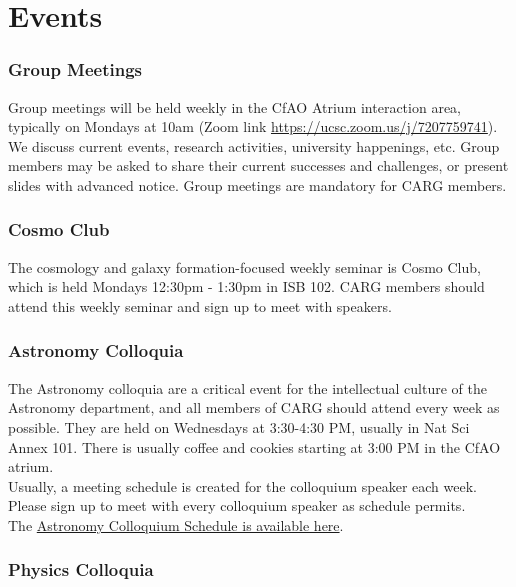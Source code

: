 \section{Events}
\label{sec:events}

\subsubsection{Group Meetings}
\label{sec:group_meetings}
Group meetings will be held
weekly
in the CfAO Atrium interaction
area, typically on Mondays at 10am
(Zoom link \href{https://ucsc.zoom.us/j/7207759741}{https://ucsc.zoom.us/j/7207759741}).
We discuss current events,
research activities, university
happenings, etc. Group members
may be asked to share their
current successes and challenges,
or present slides with advanced
notice.
Group meetings are mandatory
for CARG members.

\subsubsection{Cosmo Club}
\label{sec:cosmo_club}

The cosmology and galaxy
formation-focused weekly
seminar is Cosmo Club, 
which is held
Mondays 12:30pm - 1:30pm in
ISB 102. CARG members should
attend this weekly seminar
and sign up 
to meet with speakers.

\subsubsection{Astronomy Colloquia}
\label{sec:astro_colloquia}

The Astronomy colloquia are a
critical event for the
intellectual culture of the
Astronomy department, and all
members of CARG should attend
every week as possible.
They are held on Wednesdays
at 3:30-4:30 PM, usually in
Nat Sci Annex 101.
There is usually
coffee and cookies starting
at 3:00 PM in the CfAO atrium.\\

\noindent
Usually, a meeting schedule is 
created for the colloquium speaker each
week. Please sign up to meet
with every colloquium speaker as
schedule permits.\\

\noindent
The
\href{https://www.astro.ucsc.edu/news-events/Seminars/index.html}{Astronomy Colloquium Schedule is available here}.

\subsubsection{Physics Colloquia}
\label{sec:phys_colloquia}


